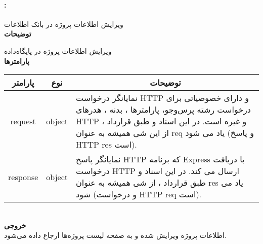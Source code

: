 \paragraph{:}
ویرایش اطلاعات پروژه در بانک اطلاعات
\\
\textbf{توضیحات}
\hr
\begin{flushleft}
	\framebox[.9\textwidth][l]{
		\lr{
			\textcolor{type}{void}
			\textcolor{func}{postEditProject}
			\textcolor{symb}{(}
			\textcolor{type}{object}
			\textcolor{arg}{request}
			\textcolor{symb}{,}
			\textcolor{type}{object}
			\textcolor{arg}{response}
			\textcolor{symb}{);}
		}
	}
\end{flushleft}
ویرایش اطلاعات پروژه در پایگاه‌داده
\\
\textbf{پارامترها}
\hr \\[10pt]
\begin{tabular}{|m{4cm}|m{3cm}|m{10cm}|}
	\hline
	\multicolumn{1}{|c}{پارامتر}
	&
	\multicolumn{1}{|c}{نوع}
	&
	\multicolumn{1}{|c|}{توضیحات}
	\\
	\hline
	\multicolumn{1}{|c}{request}
	&
	\multicolumn{1}{|c|}{object}
	&
	نمایانگر درخواست HTTP و دارای خصوصیاتی برای درخواست رشته پرس‌و‌جو، پارامترها ، بدنه ، هدرهای HTTP و غیره است.
	در این اسناد و طبق قرارداد ، از این شی همیشه به عنوان req یاد می شود (و پاسخ HTTP res است).
	\\
	\hline
	\multicolumn{1}{|c}{response}
	&
	\multicolumn{1}{|c|}{object}
	&
	نمایانگر پاسخ HTTP که برنامه Express با دریافت درخواست HTTP ارسال می کند.
	در این اسناد و طبق قرارداد ، از شی همیشه به عنوان res یاد می شود (و درخواست HTTP req است).
	\\
	\hline
\end{tabular}
\\[10pt]
\textbf{خروجی}
\hr \\
اطلاعات پروژه ویرایش شده و به صفحه لیست پروژه‌ها ارجاع داده می‌شود.

